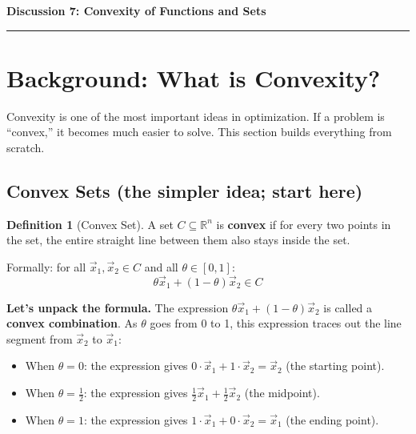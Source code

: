 \documentclass[10pt]{article}
\theoremstyle{definition}
\newtheorem{definition}{Definition}
\theoremstyle{plain}
\newcommand{\RR}{\mathbb{R}}
\begin{document}
\noindent
\begin{minipage}{\linewidth}
    \centering
    \textbf{\Large Discussion 7: Convexity of Functions and Sets} \\[0.5em]
    \hrule
\end{minipage}
\vspace{1em}

\section{Background: What is Convexity?}

Convexity is one of the most important ideas in optimization. If a problem is ``convex,'' it becomes much easier to solve. This section builds everything from scratch.

\subsection{Convex Sets (the simpler idea; start here)}

\begin{definition}[Convex Set]
A set $C \subseteq \RR^n$ is \textbf{convex} if for every two points in the set, the entire straight line between them also stays inside the set.

Formally: for all $\vec{x}_1, \vec{x}_2 \in C$ and all $\theta \in [0,1]$:
\[
    \theta \vec{x}_1 + (1 - \theta)\vec{x}_2 \in C
\]
\end{definition}

\textbf{Let's unpack the formula.} The expression $\theta \vec{x}_1 + (1-\theta)\vec{x}_2$ is called a \textbf{convex combination}. As $\theta$ goes from 0 to 1, this expression traces out the line segment from $\vec{x}_2$ to $\vec{x}_1$:
\begin{itemize}
    \item When $\theta = 0$: the expression gives $0 \cdot \vec{x}_1 + 1 \cdot \vec{x}_2 = \vec{x}_2$ (the starting point).
    \item When $\theta = \frac{1}{2}$: the expression gives $\frac{1}{2}\vec{x}_1 + \frac{1}{2}\vec{x}_2$ (the midpoint).
    \item When $\theta = 1$: the expression gives $1 \cdot \vec{x}_1 + 0 \cdot \vec{x}_2 = \vec{x}_1$ (the ending point).
\end{itemize}
\end{document}
